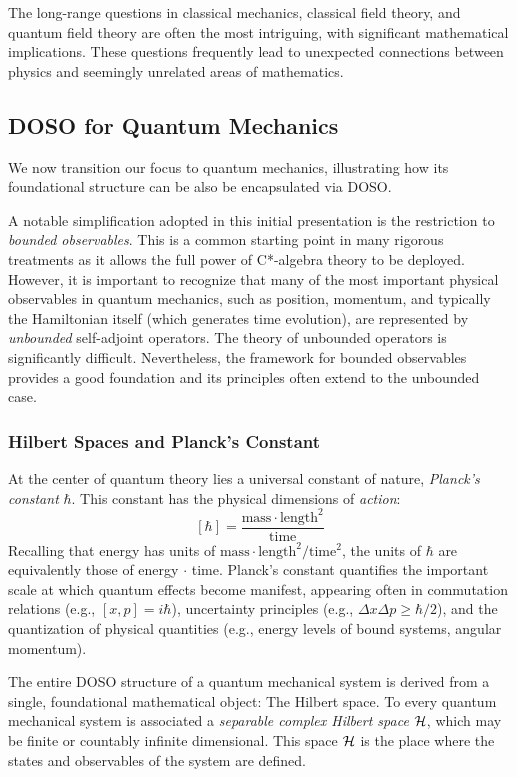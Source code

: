 \begin{remark}
The long-range questions in classical mechanics, classical field theory, and quantum field theory are often the most intriguing, with significant mathematical implications. These questions frequently lead to unexpected connections between physics and seemingly unrelated areas of mathematics.

\end{remark}

\subsection{DOSO for Quantum Mechanics}

We now transition our focus to quantum mechanics, illustrating how its foundational structure can be also be encapsulated via DOSO.

A notable simplification adopted in this initial presentation is the restriction to \emph{bounded observables}. This is a common starting point in many rigorous treatments as it allows the full power of C*-algebra theory to be deployed. However, it is important to recognize that many of the most important physical observables in quantum mechanics, such as position, momentum, and typically the Hamiltonian itself (which generates time evolution), are represented by \emph{unbounded} self-adjoint operators. The theory of unbounded operators is significantly difficult. Nevertheless, the framework for bounded observables provides a good foundation and its principles often extend to the unbounded case.

\subsubsection{Hilbert Spaces and Planck's Constant}

At the center of quantum theory lies a universal constant of nature, \textit{Planck's constant} $\hbar$. This constant has the physical dimensions of \emph{action}:
\[ [\hbar] = \frac{\text{mass} \cdot \text{length}^2}{\text{time}}\]
Recalling that energy has units of $\text{mass} \cdot \text{length}^2/\text{time}^2$, the units of $\hbar$ are equivalently those of energy $\cdot$ time. Planck's constant quantifies the important scale at which quantum effects become manifest, appearing often in commutation relations (e.g., $[x,p]=i\hbar$), uncertainty principles (e.g., $\Delta x \Delta p \ge \hbar/2$), and the quantization of physical quantities (e.g., energy levels of bound systems, angular momentum).

The entire DOSO structure of a quantum mechanical system is derived from a single, foundational mathematical object: The Hilbert space. To every quantum mechanical system is associated a \textit{separable complex Hilbert space} $\mathcal{H}$, which may be finite or countably infinite dimensional. This space $\mathcal{H}$ is the place where the states and observables of the system are defined.

